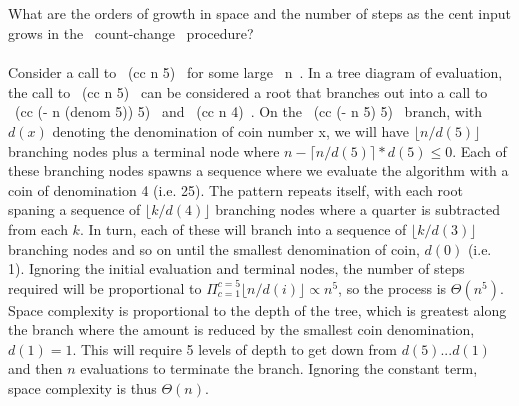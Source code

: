 \documentclass{article}
\begin{document}
\subsection{}
What are the orders of growth in space and the number of steps as the cent input grows in the ~count-change~ procedure?\\ \\
Consider a call to ~(cc n 5)~ for some large ~n~. In a tree diagram of evaluation, the call to ~(cc n 5)~ can be considered a root that branches out into a call to ~(cc (- n (denom 5)) 5)~ and ~(cc n 4)~. On the ~(cc (- n 5) 5)~ branch, with $d(x)$ denoting the denomination of coin number x, we will have $\lfloor n / d(5) \rfloor$ branching nodes plus a terminal node where $n - \lceil n / d(5) \rceil * d(5) \le 0$. Each of these branching nodes spawns a sequence where we evaluate the algorithm with a coin of denomination 4 (i.e. 25). The pattern repeats itself, with each root spaning a sequence of $\lfloor k / d(4) \rfloor$ branching nodes where a quarter is subtracted from each $k$. In turn, each of these will branch into a sequence of $\lfloor k / d(3) \rfloor$ branching nodes and so on until the smallest denomination of coin, $d(0)$ (i.e. 1). Ignoring the initial evaluation and terminal nodes, the number of steps required will be proportional to $\Pi_{c=1}^{c=5} \lfloor n/d(i) \rfloor \propto n^5$, so the process is $\Theta(n^5)$.\\
Space complexity is proportional to the depth of the tree, which is greatest along the branch where the amount is reduced by the smallest coin denomination, $d(1) =  1$. This will require 5 levels of depth to get down from $d(5) ... d(1)$ and then $n$ evaluations to terminate the branch. Ignoring the constant term, space complexity is thus $\Theta(n)$.

\end{document}
